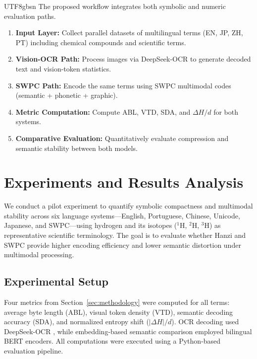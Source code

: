 \documentclass[conference]{IEEEtran}
\begin{document}
\begin{CJK*}{UTF8}{gbsn}
The proposed workflow integrates both symbolic and numeric evaluation paths. %


\begin{enumerate}
    \item \textbf{Input Layer:} Collect parallel datasets of multilingual terms (EN, JP, ZH, PT) including chemical compounds and scientific terms.  
    \item \textbf{Vision-OCR Path:} Process images via DeepSeek-OCR to generate decoded text and vision-token statistics.  
    \item \textbf{SWPC Path:} Encode the same terms using SWPC multimodal codes (semantic + phonetic + graphic).  
    \item \textbf{Metric Computation:} Compute ABL, VTD, SDA, and $\Delta H/d$ for both systems.  
    \item \textbf{Comparative Evaluation:} Quantitatively evaluate compression and semantic stability between both models.
\end{enumerate}


\section{Experiments and Results Analysis}
\label{sec:results}

We conduct a pilot experiment to quantify symbolic compactness and multimodal stability across six language systems—English, Portuguese, Chinese, Unicode, Japanese, and SWPC—using hydrogen and its isotopes ($^{1}$H, $^{2}$H, $^{3}$H) as representative scientific terminology. The goal is to evaluate whether Hanzi and SWPC provide higher encoding efficiency and lower semantic distortion under multimodal processing.

\subsection{Experimental Setup}

Four metrics from Section~\ref{sec:methodology} were computed for all terms:
average byte length (ABL), visual token density (VTD), semantic decoding accuracy (SDA), and normalized entropy shift ($|\Delta H|/d$).
OCR decoding used DeepSeek-OCR \cite{wei2025deepseek}, while embedding-based semantic comparison employed bilingual BERT encoders.
All computations were executed using a Python-based evaluation pipeline.


\end{CJK*}
\end{document}
